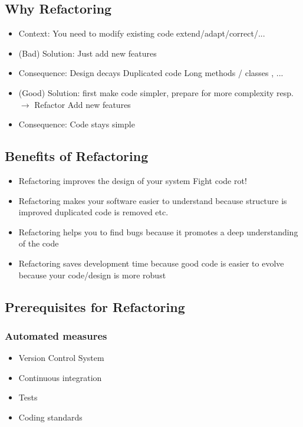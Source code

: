 \documentclass[10pt]{article}
\begin{document}
	\subsection{Why Refactoring}
	\begin{itemize}
		\item Context: You need to modify existing code 
			\subitem extend/adapt/correct/...
		\item (Bad) Solution:
			\subitem Just add new features
		\item Consequence: 
			\subitem Design decays
			\subitem Duplicated code
			\subitem Long methods / classes , ...
		\item (Good) Solution:
			\subitem first make code simpler, prepare for more complexity resp. $\rightarrow$ Refactor
			\subitem Add new features
		\item Consequence:
			\subitem Code stays simple
	\end{itemize}
	\subsection{Benefits of Refactoring}
	\begin{itemize}
		\item Refactoring improves the design of your system 
			\subitem Fight code rot!
		\item  Refactoring makes your software easier to understand 
			\subitem because structure is improved
			\subitem duplicated code is removed
			\subitem etc.
		\item Refactoring helps you to find bugs
			\subitem because it promotes a deep understanding of the code
		\item Refactoring saves development time 
			\subitem because good code is easier to evolve 
			\subitem because your code/design is more robust
	\end{itemize}

	\subsection{Prerequisites for Refactoring}
	\subsubsection{Automated measures}
	\begin{itemize}
		\item Version Control System 
		\item Continuous integration 
		\item Tests
		\item Coding standards
	\end{itemize}
	
\end{document}
